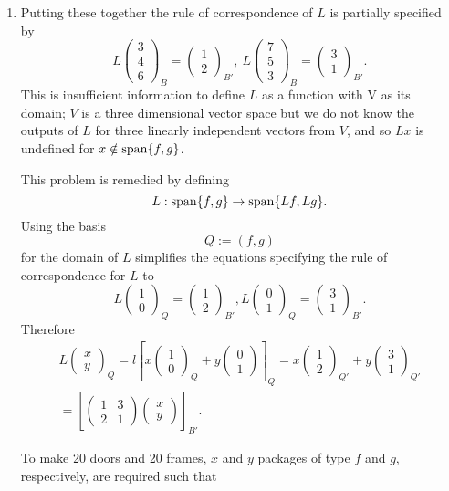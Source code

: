 \documentclass[12pt]{article}
\def\ba{\left(\begin{array}{cc}}
\def\ea{\end{array}\right) }
\def\bv{\left(\begin{array}{c}}
\def\ev{\end{array}\right) }
\def\span{ {\rm span}}
\begin{document}
\begin{enumerate}
\begin{enumerate}
\item 
Putting these together the rule of correspondence of $L$ is partially specified by
\[ L\bv 3\\4\\6 \ev_B=\bv 1\\2\ev _{B'} , ~L\bv 7\\5\\3 \ev_B=\bv3\\1 \ev _{B'}.\]
This is insufficient information to define $L$ as a function with V as its domain; $V$ is a three dimensional vector space but we do not know the outputs of $L$ for three linearly independent vectors from $V$, 
and so $Lx$ is undefined for $x\notin \span\{ f,g\}$. 

This  problem is remedied by defining 
\[L: \span \{ f,g \} \to  \span\{Lf,Lg\} .\] 
Using the basis 
\[ Q:=(f,g)\] 
for  the domain of $L$ simplifies the equations specifying the rule of correspondence for $L$ to 
\[L \bv 1\\0 \ev_Q = \bv 1\\2 \ev_{B'}, L\bv 0\\1 \ev_Q = \bv 3\\1 \ev_{B'}.\]
Therefore
\begin{gather*}L\bv x\\y \ev_Q= l \left[   x \bv 1\\0 \ev_Q+y \bv 0\\1 \ev \right]_{Q}
=x\bv 1\\2 \ev_{Q'} +y \bv 3\\1 \ev_{Q'}\\
= 
\left[       \ba 1&3\\2&1\ea \bv x\\y \ev 
\right]_{B'}.\end{gather*}

To make 20 doors and 20 frames, $x$ and $y$ packages of type $f$ and $g$, respectively, are required such that 


\end{enumerate}
\end{enumerate}
\end{document}
